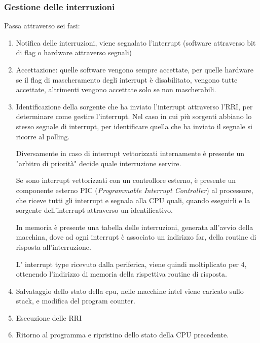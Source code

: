 \documentclass[../template]{subfiles}
\begin{document}
\subsubsection{Gestione delle interruzioni}
Passa attraverso sei fasi:
\begin{enumerate}
    \item Notifica delle interruzioni, viene segnalato l'interrupt (software attraverso bit di flag o hardware attraverso segnali)

    \item Accettazione: quelle software vengono sempre accettate, per quelle hardware se il flag di mascheramento degli interrupt è disabilitato, vengono tutte accettate, altrimenti vengono accettate solo se non mascherabili.

    \item Identificazione della sorgente che ha inviato l'interrupt attraverso l'RRI, per determinare come gestire l'interrupt.
        Nel caso in cui più sorgenti abbiano lo stesso segnale di interrupt, per identificare quella che ha inviato il segnale si ricorre al polling.

        Diversamente in caso di interrupt vettorizzati internamente è presente un "arbitro di priorità" decide quale interruzione servire.

        Se sono interrupt vettorizzati con un controllore esterno, è presente un componente esterno PIC (\textit{Programmable Interrupt Controller}) al processore, che riceve tutti gli interrupt e segnala alla CPU quali, quando eseguirli e la sorgente dell'interrupt attraverso un identificativo.

        In memoria è presente una tabella delle interruzioni, generata all'avvio della macchina, dove ad ogni interrupt è associato un indirizzo far, della routine di risposta all'interruzione.

        L' interrupt type ricevuto dalla periferica, viene quindi moltiplicato per 4, ottenendo l'indirizzo di memoria della rispettiva routine di risposta.

    \item Salvataggio dello stato della cpu, nelle macchine intel viene caricato sullo stack, e modifica del program counter.

    \item Esecuzione delle RRI

    \item Ritorno al programma e ripristino dello stato della CPU precedente.
\end{enumerate}
\end{document}

